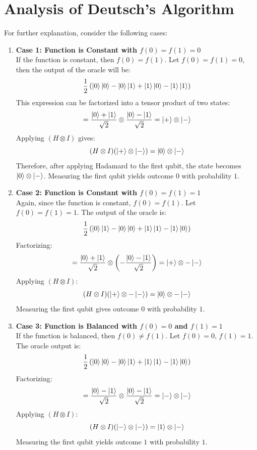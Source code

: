 \section*{Analysis of Deutsch's Algorithm}

For further explanation, consider the following cases:

\begin{enumerate}
    \item \textbf{Case 1: Function is Constant with $f(0)=f(1)=0$} \\
    If the function is constant, then $f(0) = f(1)$. Let $f(0) = f(1) = 0$, then the output of the oracle will be:
    \[
        \frac{1}{2}\left(\ket{0}\ket{0} - \ket{0}\ket{1} + \ket{1}\ket{0} - \ket{1}\ket{1}\right)
    \]
    This expression can be factorized into a tensor product of two states:
    \[
        = \frac{\ket{0} + \ket{1}}{\sqrt{2}} \otimes \frac{\ket{0} - \ket{1}}{\sqrt{2}} = \ket{+} \otimes \ket{-}
    \]
    Applying $(H \otimes I)$ gives:
    \[
        (H \otimes I)(\ket{+} \otimes \ket{-}) = \ket{0} \otimes \ket{-}
    \]
    Therefore, after applying Hadamard to the first qubit, the state becomes $\ket{0} \otimes \ket{-}$. Measuring the first qubit yields outcome $0$ with probability $1$.

    \item \textbf{Case 2: Function is Constant with $f(0)=f(1)=1$} \\
    Again, since the function is constant, $f(0) = f(1)$. Let $f(0) = f(1) = 1$. The output of the oracle is:
    \[
        \frac{1}{2}\left(\ket{0}\ket{1} - \ket{0}\ket{0} + \ket{1}\ket{1} - \ket{1}\ket{0}\right)
    \]
    Factorizing:
    \[
        = \frac{\ket{0} + \ket{1}}{\sqrt{2}} \otimes \left(-\frac{\ket{0} - \ket{1}}{\sqrt{2}}\right) = \ket{+} \otimes -\ket{-}
    \]
    Applying $(H \otimes I)$:
    \[
        (H \otimes I)(\ket{+} \otimes -\ket{-}) = \ket{0} \otimes -\ket{-}
    \]
    Measuring the first qubit gives outcome $0$ with probability $1$.

    \item \textbf{Case 3: Function is Balanced with $f(0)=0$ and $f(1)=1$} \\
    If the function is balanced, then $f(0) \neq f(1)$. Let $f(0) = 0$, $f(1) = 1$. The oracle output is:
    \[
        \frac{1}{2}\left(\ket{0}\ket{0} - \ket{0}\ket{1} + \ket{1}\ket{1} - \ket{1}\ket{0}\right)
    \]
    Factorizing:
    \[
        = \frac{\ket{0} - \ket{1}}{\sqrt{2}} \otimes \frac{\ket{0} - \ket{1}}{\sqrt{2}} = \ket{-} \otimes \ket{-}
    \]
    Applying $(H \otimes I)$:
    \[
        (H \otimes I)(\ket{-} \otimes \ket{-}) = \ket{1} \otimes \ket{-}
    \]
    Measuring the first qubit yields outcome $1$ with probability $1$.


\end{enumerate}

